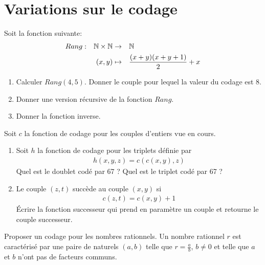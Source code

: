 \documentclass[french,a4paper,10pt]{article}
\begin{document}
	\section{Variations sur le codage}
	
	\begin{td-exo}
		Soit la fonction suivante:
			\[\begin{aligned}
				Rang&: & \mathbb{N}\times \mathbb{N}&\to&&\mathbb{N}\\
				&~&(x,y)&\mapsto&&\frac{(x+y)(x+y+1)}2+x
			\end{aligned}\]
		
		\begin{enumerate}
			\item Calculer $Rang(4,5)$. Donner le couple pour lequel la valeur du codage est 8.
			
			 \item Donner une version récursive de la fonction $Rang$.
			 
			 \item Donner la fonction inverse.
		\end{enumerate}
	\end{td-exo}
	
	\begin{td-exo}[]
		Soit $c$ la fonction de codage pour les couples d'entiers vue en cours.
		
		\begin{enumerate}
			\item Soit $h$ la fonction de codage pour les triplets définie par
				\[\begin{aligned}
					h(x,y,z)=c(c(x,y),z)
				\end{aligned}\]
				Quel est le doublet codé par 67 ? Quel est le triplet codé par 67 ?
				
			\item Le couple $(z,t)$ succède au couple $(x,y)$ si 
			\[\begin{aligned}
				c(z,t)=c(x,y)+1
			\end{aligned}\]
			Écrire la fonction successeur qui prend en paramètre un couple et retourne le couple successeur.
		\end{enumerate}
		
	\end{td-exo}
	
	\begin{td-exo}[]
		Proposer un codage pour les nombres rationnels. Un nombre rationnel $r$ est caractérisé par une paire de naturels $(a,b)$ telle que $r=\frac ab$, $b\ne0$ et telle que $a$ et $b$ n'ont pas de facteurs communs.
		
	\end{td-exo}
	
\end{document}
